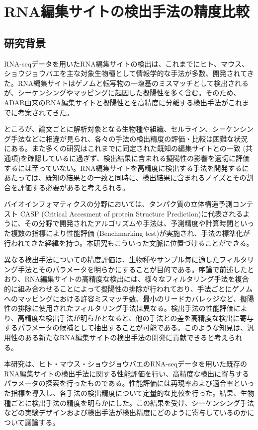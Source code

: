 \chapter{RNA編集サイトの検出手法の精度比較}
\label{bench}
\section{研究背景}
RNA-seqデータを用いたRNA編集サイトの検出は、これまでにヒト、マウス、ショウジョウバエを主な対象生物種として情報学的な手法が多数、開発されてきた。RNA編集サイトはゲノムと転写物の一塩基のミスマッチとして検出されるが、シーケンシングやマッピングに起因した擬陽性を多く含む。そのため、ADAR由来のRNA編集サイトと擬陽性とを高精度に分離する検出手法がこれまでに考案されてきた。
\par
ところが、論文ごとに解析対象となる生物種や組織、セルライン、シーケンシング手法などに相違が見られ、各々の手法の検出精度の評価・比較は困難な状況にある。また多くの研究はこれまでに同定された既知の編集サイトとの一致 (共通項)を確認しているに過ぎず、検出結果に含まれる擬陽性の影響を適切に評価するには至っていない。RNA編集サイトを高精度に検出する手法を開発するにあたっては、既知の結果との一致と同時に、検出結果に含まれるノイズとその割合を評価する必要があると考えられる。
\par
バイオインフォマティクスの分野においては、タンパク質の立体構造予測コンテスト CASP (Critical Accesment of protein Structure Prediction)に代表されるように、その分野で開発されたアルゴリズムや手法は、予測精度や計算時間といった複数の指標により性能評価 (Benchmarking test)が実施され、手法の標準化が行われてきた経緯を持つ。本研究もこういった文脈に位置づけることができる。
\par
異なる検出手法についての精度評価は、生物種やサンプル毎に適したフィルタリング手法とそのパラメータを明らかにすることが目的である。序論で前述したとおり、RNA編集サイトの高精度な検出には、様々なフィルタリング手法を複合的に組み合わせることによって擬陽性の排除が行われており、手法ごとにゲノムへのマッピングにおける許容ミスマッチ数、最小のリードカバレッジなど、擬陽性の排除に使用されたフィルタリング手法は異なる。検出手法の性能評価により、高精度な検出手法が明らかとなると、他の手法との差を高精度な検出に寄与するパラメータの候補として抽出することが可能である。このような知見は、汎用性のある新たなRNA編集サイトの検出手法の開発に貢献できると考えられる。
\par
本研究は、ヒト・マウス・ショウジョウバエのRNA-seqデータを用いた既存のRNA編集サイトの検出手法に関する性能評価を行い、高精度な検出に寄与するパラメータの探索を行ったものである。性能評価には再現率および適合率といった指標を導入し、各手法の検出精度について定量的な比較を行った。結果、生物種ごとに検出手法の精度を明らかにした。この結果を受け、シーケンシング手法などの実験デザインおよび検出手法が検出精度にどのように寄与しているのかについて議論する。

